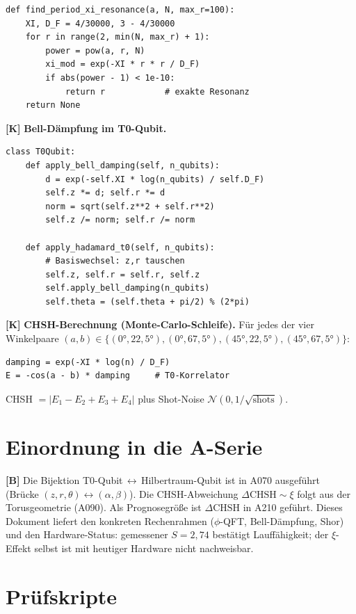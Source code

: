 \begin{verbatim}
def find_period_xi_resonance(a, N, max_r=100):
    XI, D_F = 4/30000, 3 - 4/30000
    for r in range(2, min(N, max_r) + 1):
        power = pow(a, r, N)
        xi_mod = exp(-XI * r * r / D_F)
        if abs(power - 1) < 1e-10:
            return r            # exakte Resonanz
    return None
\end{verbatim}

\textbf{[K]} \textbf{Bell-Dämpfung im T0-Qubit.}
\begin{verbatim}
class T0Qubit:
    def apply_bell_damping(self, n_qubits):
        d = exp(-self.XI * log(n_qubits) / self.D_F)
        self.z *= d; self.r *= d
        norm = sqrt(self.z**2 + self.r**2)
        self.z /= norm; self.r /= norm

    def apply_hadamard_t0(self, n_qubits):
        # Basiswechsel: z,r tauschen
        self.z, self.r = self.r, self.z
        self.apply_bell_damping(n_qubits)
        self.theta = (self.theta + pi/2) % (2*pi)
\end{verbatim}

\textbf{[K]} \textbf{CHSH-Berechnung (Monte-Carlo-Schleife).} Für jedes der
vier Winkelpaare $(a,b)\in\{(0°,22{,}5°),(0°,67{,}5°),(45°,22{,}5°),(45°,67{,}5°)\}$:
\begin{verbatim}
damping = exp(-XI * log(n) / D_F)
E = -cos(a - b) * damping     # T0-Korrelator
\end{verbatim}
CHSH $= |E_1 - E_2 + E_3 + E_4|$ plus Shot-Noise $\mathcal N(0,1/\sqrt{\text{shots}})$.

\section{Einordnung in die A-Serie}

\textbf{[B]} Die Bijektion T0-Qubit\,$\leftrightarrow$\,Hilbertraum-Qubit ist in
A070 ausgeführt (Brücke $(z,r,\theta)\leftrightarrow(\alpha,\beta)$). Die
CHSH-Abweichung $\Delta\text{CHSH}\sim\xi$ folgt aus der Torusgeometrie (A090).
Als Prognosegröße ist $\Delta\text{CHSH}$ in A210 geführt. Dieses Dokument
liefert den konkreten Rechenrahmen ($\phi$-QFT, Bell-Dämpfung, Shor) und den
Hardware-Status: gemessener $S=2{,}74$ bestätigt Lauffähigkeit; der $\xi$-Effekt
selbst ist mit heutiger Hardware nicht nachweisbar.

\section{Prüfskripte}

